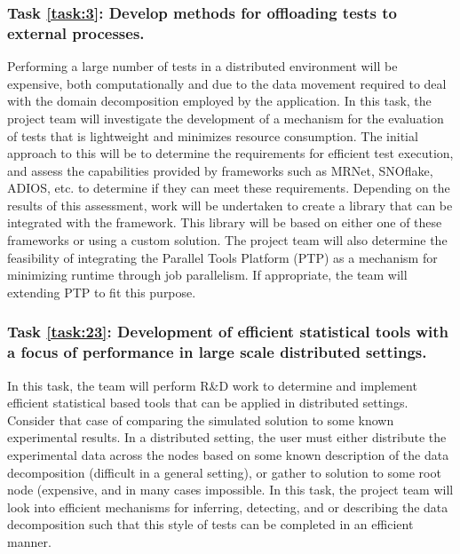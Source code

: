 \subsubsection{Task \ref{task:3}: Develop methods for offloading tests to external processes. }
Performing a large number of \VV tests in a distributed environment will be expensive, both computationally and due to the data movement required to deal with the domain decomposition employed by the application. In this task, the project team will investigate the development of a mechanism for the evaluation of \VV tests that is lightweight and minimizes resource consumption. The initial approach to this will be to determine the requirements for efficient \VV test execution, and assess the capabilities provided by frameworks such as MRNet, SNOflake, ADIOS, etc. to determine if they can meet these requirements. Depending on the results of this assessment, work will be undertaken to create a library that can be integrated with the \VV framework. This library will be based on either one of these frameworks or using a custom solution. The project team will also determine the feasibility of integrating the Parallel Tools Platform (PTP) as a mechanism for minimizing \VV runtime through job parallelism. If appropriate, the team will extending PTP to fit this purpose.   


\label{task:23}
\subsubsection{Task \ref{task:23}: Development of efficient statistical \VV tools with a focus of performance in large scale distributed settings.}

In this task, the team will perform R\&D work to determine and implement efficient statistical based \VV tools that can be applied in distributed settings. Consider that case of comparing the simulated solution to some known experimental results. In a distributed setting, the user must either distribute the experimental data across the nodes based on some known description of the data decomposition (difficult in a general setting), or gather to solution to some root node (expensive, and in many cases impossible. In this task, the project team will look into efficient mechanisms for inferring, detecting, and or describing the data decomposition such that this style of tests can be completed in an efficient manner. 

